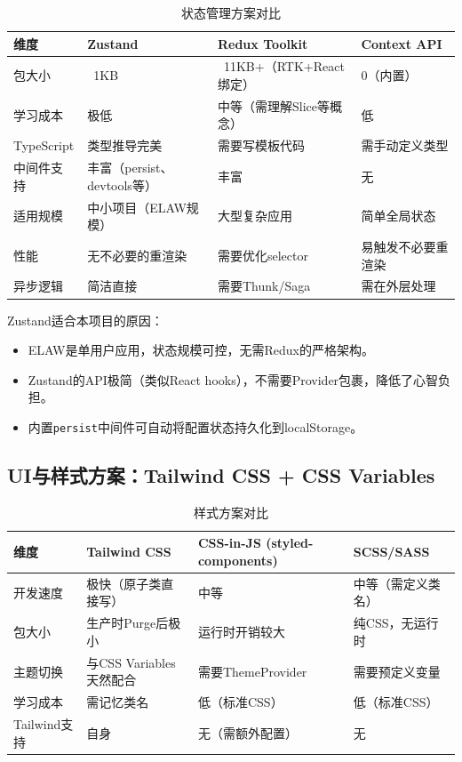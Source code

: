 \documentclass[fontset=mac,a4paper,11pt]{ctexart}
\begin{document}
\begin{table}[H]
\centering
\caption{状态管理方案对比}
\label{tab:state-management}
\begin{tabular}{L{2.5cm}L{3.5cm}L{3.5cm}L{3.5cm}}
\toprule
\textbf{维度} & \textbf{Zustand} & \textbf{Redux Toolkit} & \textbf{Context API} \\
\midrule
{}
包大小 & ~1KB & ~11KB+（RTK+React绑定） & 0（内置） \\
学习成本 & 极低 & 中等（需理解Slice等概念） & 低 \\
TypeScript & 类型推导完美 & 需要写模板代码 & 需手动定义类型 \\
中间件支持 & 丰富（persist、devtools等） & 丰富 & 无 \\
适用规模 & 中小项目（ELAW规模） & 大型复杂应用 & 简单全局状态 \\
性能 & 无不必要的重渲染 & 需要优化selector & 易触发不必要重渲染 \\
异步逻辑 & 简洁直接 & 需要Thunk/Saga & 需在外层处理 \\
\bottomrule
\end{tabular}
\end{table}

Zustand适合本项目的原因：
\begin{itemize}[leftmargin=2em]
\item ELAW是单用户应用，状态规模可控，无需Redux的严格架构。
\item Zustand的API极简（类似React hooks），不需要Provider包裹，降低了心智负担。
\item 内置\texttt{persist}中间件可自动将配置状态持久化到localStorage。
\end{itemize}

\subsection{UI与样式方案：Tailwind CSS + CSS Variables}

\begin{table}[H]
\centering
\caption{样式方案对比}
\label{tab:styling}
\begin{tabular}{L{2.5cm}L{3.5cm}L{3.5cm}L{3.5cm}}
\toprule
\textbf{维度} & \textbf{Tailwind CSS} & \textbf{CSS-in-JS (styled-components)} & \textbf{SCSS/SASS} \\
\midrule
{}
开发速度 & 极快（原子类直接写） & 中等 & 中等（需定义类名） \\
包大小 & 生产时Purge后极小 & 运行时开销较大 & 纯CSS，无运行时 \\
主题切换 & 与CSS Variables天然配合 & 需要ThemeProvider & 需要预定义变量 \\
学习成本 & 需记忆类名 & 低（标准CSS） & 低（标准CSS） \\
Tailwind支持 & 自身 & 无（需额外配置） & 无 \\
\bottomrule
\end{tabular}
\end{table}
\end{document}
